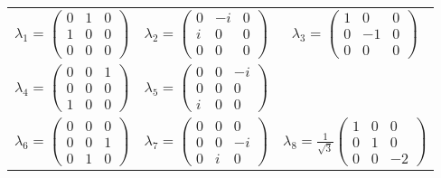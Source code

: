 \begin{table}[h]
    \centering
    \begin{tabular}{c c c}
        $\lambda_1 =  \begin{pmatrix} 0 & 1 & 0 \\ 1 & 0 & 0 \\ 0 & 0 & 0 \end{pmatrix}$ & $\lambda_2 =  \begin{pmatrix} 0 & -i & 0 \\ i & 0 & 0 \\ 0 & 0 & 0 \end{pmatrix}$ & $\lambda_3 =  \begin{pmatrix} 1 & 0 & 0 \\ 0 & -1 & 0 \\ 0 & 0 & 0 \end{pmatrix}$ \\
        $\lambda_4 =  \begin{pmatrix} 0 & 0 & 1 \\ 0 & 0 & 0 \\ 1 & 0 & 0 \end{pmatrix}$ & $\lambda_5 =  \begin{pmatrix} 0 & 0 & -i \\ 0 & 0 & 0 \\ i & 0 & 0 \end{pmatrix}$ & \\
        $\lambda_6 =  \begin{pmatrix} 0 & 0 & 0 \\ 0 & 0 & 1 \\ 0 & 1 & 0 \end{pmatrix}$ & $\lambda_7 =  \begin{pmatrix} 0 & 0 & 0 \\ 0 & 0 & -i \\ 0 & i & 0 \end{pmatrix}$ & $\lambda_8 =  \frac{1}{\sqrt{3}}\begin{pmatrix} 1 & 0 & 0 \\ 0 & 1 & 0 \\ 0 & 0 & -2 \end{pmatrix}$
    \end{tabular}
\end{table}